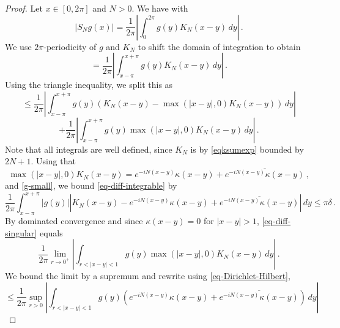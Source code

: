 \begin{proof}
    \leanok
    Let $x\in [0,2\pi]$ and $N>0$. We have with 
    \begin{equation*}
        |S_N g(x)| = \frac{1}{2\pi} \left| \int_0^{2\pi} g(y) K_N(x-y) \, dy\right|\,.
    \end{equation*}
    We use $2\pi$-periodicity of $g$ and $K_N$ to shift the domain of integration to obtain
    \begin{equation*}
        = \frac{1}{2\pi} \left|\int_{x-\pi}^{x+\pi} g(y) K_N(x-y) \, dy\right|\,.
    \end{equation*}
    Using the triangle inequality, we split this as
    \begin{equation}
        \label{eq-diff-integrable}
        \le \frac{1}{2\pi} \left|\int_{x-\pi}^{x+\pi} g(y) \left(K_N(x-y) - \max(|x-y|,0) K_N(x-y)\right) \, dy \right|
    \end{equation}
    \begin{equation}
        \label{eq-diff-singular}
        + \frac{1}{2\pi} \left|\int_{x-\pi}^{x+\pi} g(y) \max(|x-y|,0) K_N(x-y) \, dy\right|\,.
    \end{equation}
    Note that all integrals are well defined, since $K_N$ is by \eqref{eqksumexp} bounded by $2N+1$.
    Using that
    \begin{equation}
        \label{eq-Dirichlet-Hilbert}
        \max(|x-y|,0) K_N(x-y) = e^{-iN(x-y)}\kappa(x-y) + \overline{e^{-iN(x-y)}\kappa(x-y)} \,,
    \end{equation}
     and \eqref{g-small}, we bound \eqref{eq-diff-integrable} by
    \begin{equation*}
        \frac{1}{2\pi} \int_{x-\pi}^{x+\pi} |g(y)| \left|K_N(x-y) - e^{-iN(x-y)}\kappa(x-y) + \overline{e^{-iN(x-y)}\kappa(x-y)}\right|\, dy
        \le \pi\delta \,.
    \end{equation*}
    By dominated convergence and since $\kappa(x-y) = 0$ for $|x-y| > 1$, \eqref{eq-diff-singular} equals
    \begin{equation*}
        \frac{1}{2\pi} \lim_{r \to 0^+} \left| \int_{r < |x-y| < 1} g(y) \max(|x-y|,0) K_N(x-y) \, dy\right|\,.
    \end{equation*}
    We bound the limit by a supremum and rewrite using \eqref{eq-Dirichlet-Hilbert},
    \begin{equation*}
        \le \frac{1}{2\pi} \sup_{r > 0} \left| \int_{r < |x-y| < 1} g(y) \left(e^{-iN(x-y)}\kappa(x-y) + \overline{e^{-iN(x-y)}\kappa(x-y)}\right) \, dy\right|

\end{equation*}
\end{proof}
